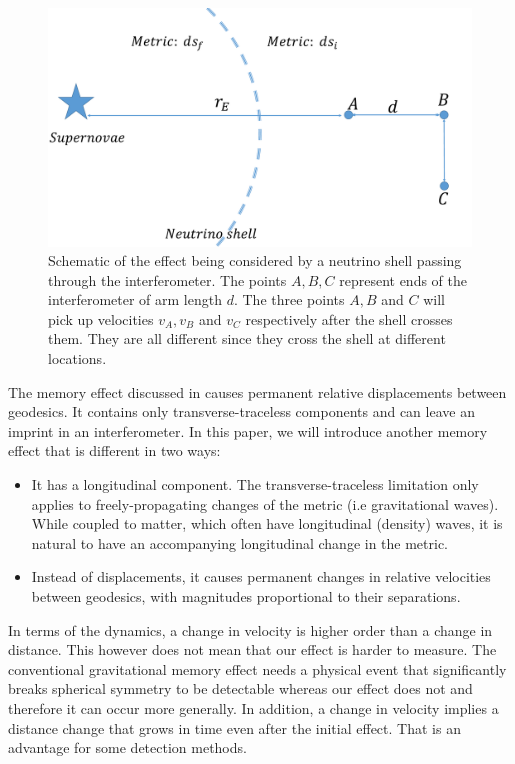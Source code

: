 \documentclass[aps,showpacs,onecolumn,floats,prd,superscriptaddress,nofootinbib]{revtex4-1}
\begin{document}
\begin{figure}[b]
\begin{center}
\includegraphics[scale = 0.27]{intro.pdf}
\caption{Schematic of the effect being considered by a neutrino shell passing through the interferometer. The points $A,B,C$ represent ends of the interferometer of arm length $d$. The three points $A,B$ and $C$ will pick up velocities $v_A, v_B$ and $v_C$ respectively after the shell crosses them. They are all different since they cross the shell at different locations.}
\label{fig:1}
\end{center}
\end{figure}

The memory effect discussed in \cite{Christodoulou_effect,GW_memory} causes permanent relative displacements between geodesics. It contains only transverse-traceless components and can leave an imprint in an interferometer. In this paper, we will introduce another memory effect that is different in two ways:
\begin{itemize}
\item It has a longitudinal component. The transverse-traceless limitation only applies to freely-propagating changes of the metric (i.e gravitational waves). While coupled to matter, which often have longitudinal (density) waves, it is natural to have an accompanying longitudinal change in the metric.
\item Instead of displacements, it causes permanent changes in relative velocities between geodesics, with magnitudes proportional to their separations.
\end{itemize}

In terms of the dynamics, a change in velocity is higher order than a change in distance. This however does not mean that our effect is harder to measure. The conventional gravitational memory effect needs a physical event that significantly breaks spherical symmetry to be detectable whereas our effect does not and therefore it can occur more generally. In addition, a change in velocity implies a distance change that grows in time even after the initial effect. That is an advantage for some detection methods.  
\end{document}
